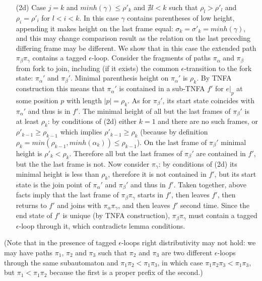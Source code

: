\documentclass[AMA,STIX1COL]{WileyNJD-v2}
\begin{document}
\begin{proofEnd}
\begin{itemize}[itemsep=0.5em, topsep=0.5em]
\begin{itemize}
        \item[(2d)]
            Case $j = k$ and $minh (\gamma) \leq \rho'_k$
            and $\nexists l < k$ such that $\rho_l > \rho'_l$ and $\rho_i = \rho'_i$ for $l < i < k$.
            In this case $\gamma$ contains parentheses of low height,
            appending it makes height on the last frame equal:
            $\sigma_k = \sigma'_k = minh (\gamma)$,
            and this may change comparison result
            as the relation on the last preceding differing frame may be different.
            We show that in this case the extended path $\pi_\beta \pi_\gamma$ contains a tagged $\epsilon$-loop.
            Consider the fragments of paths $\pi_\alpha$ and $\pi_\beta$ from fork to join,
            including (if it exists) the common $\epsilon$-transition to the fork state:
            $\pi_\alpha'$ and $\pi_\beta'$.
            Minimal parenthesis height on $\pi_\alpha'$ is $\rho_k$.
            By TNFA construction this means that $\pi_\alpha'$ is contained
            in a sub-TNFA $f'$ for $e|_p$ at some position $p$ with length $|p| = \rho_k$.
            As for $\pi_\beta'$, its start state coincides with $\pi_\alpha'$ and thus is in $f'$.
            The minimal height of all but the last frames of $\pi_\beta'$ is at least $\rho_k$:
            by conditions of (2d) either $k = 1$ and there are no such frames,
            or $\rho'_{k-1} \geq \rho_{k-1}$ which implies $\rho'_{k-1} \geq \rho_k$
            (because by definition $\rho_k = min(\rho_{k-1}, minh(\alpha_k)) \leq \rho_{k-1}$).
            On the last frame of $\pi_\beta'$ minimal height is $\rho'_k < \rho_k$.
            Therefore all but the last frames of $\pi_\beta'$ are contained in $f'$,
            but the the last frame is not.
            Now consider $\pi_\gamma$: by conditions of (2d) its minimal height is less than $\rho_k$,
            therefore it is not contained in $f'$,
            but its start state is the join point of $\pi_\alpha'$ and $\pi_\beta'$ and thus in $f'$.
            Taken together, above facts imply that the last frame of $\pi_\beta \pi_\gamma$
            starts in $f'$, then leaves $f'$, then returns to $f'$ and joins with $\pi_\alpha \pi_\gamma$,
            and then leaves $f'$ second time.
            Since the end state of $f'$ is unique (by TNFA construction),
            $\pi_\beta \pi_\gamma$ must contain a tagged $\epsilon$-loop through it,
            which contradicts lemma conditions.
        \end{itemize}
    \end{itemize}
    (Note that in the presence of tagged $\epsilon$-loops right distributivity may not hold:
    we may have paths $\pi_1$, $\pi_2$ and $\pi_3$
    such that $\pi_2$ and $\pi_3$ are two different $\epsilon$-loops through the same subautomaton
    and $\pi_1 \pi_2 < \pi_1 \pi_3$,
    in which case $\pi_1 \pi_2 \pi_3 < \pi_1 \pi_3$,
    but $\pi_1 < \pi_1 \pi_2$ because the first is a proper prefix of the second.)
\end{proofEnd}
\end{document}
